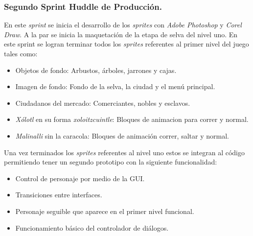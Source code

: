 \subsubsection{Segundo Sprint Huddle de Producción.}
En este \textit{sprint} se inicia el desarrollo de los \textit{sprites} con \textit{Adobe Photoshop} 
y \textit{Corel Draw}. A la par se inicia la maquetación de la etapa de selva 
del nivel uno. En este sprint se logran terminar todos los \textit{sprites} referentes 
al primer nivel del juego tales como: 
\begin{itemize}
        \item Objetos de fondo: Arbustos, árboles, jarrones y cajas. 
        \item Imagen de fondo: Fondo de la selva, la ciudad y el menú principal. 
        \item Ciudadanos del mercado: Comerciantes, nobles y esclavos. 
        \item \textit{Xólotl} en su forma \textit{xoloitzcuintle}: Bloques de 
        animacion para correr y normal.
        \item \textit{Malinalli} sin la caracola: Bloques de animación correr, 
        saltar y normal.
\end{itemize}
Una vez terminados los \textit{sprites} referentes al nivel uno estos se integran al código 
permitiendo tener un segundo prototipo con la siguiente funcionalidad:
\begin{itemize}
        \item Control de personaje por medio de la GUI.
        \item Transiciones entre interfaces.
        \item Personaje seguible que aparece en el primer nivel funcional.
        \item Funcionamiento básico del controlador de diálogos.
\end{itemize}
